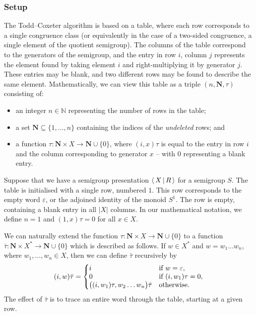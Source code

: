 \subsubsection{Setup}

The Todd--Coxeter algorithm is based on a table, where each row corresponds to a
single congruence class (or equivalently in the case of a two-sided congruence,
a single element of the quotient
semigroup).  The columns of the table correspond to the generators of the
semigroup, and the entry in row $i$, column $j$ represents the element found by
taking element $i$ and right-multiplying it by generator $j$.  These entries may
be blank, and two different rows may be found to describe the same element.
Mathematically, we can view this table as a triple $(n, \mathbf{N}, \tau)$
consisting of:
\begin{itemize}
\item an integer $n \in \mathbb{N}$ representing the number of rows in the table;
\item a set $\mathbf{N} \subseteq \{1, \ldots, n\}$ containing the indices of the
  \textit{undeleted} rows; and
\item a function $\tau: \mathbf{N} \times X \to \mathbf{N} \cup \{0\}$, where
  $(i, x)\tau$ is equal to the entry in row $i$ and the column corresponding to
  generator $x$ -- with $0$ representing a blank entry.
\end{itemize}

Suppose that we have a semigroup presentation $\left\langle \, X \, \middle| \, R \, \right\rangle$ for a semigroup
$S$.  The table is initialised with a single row, numbered $1$.  This row
corresponds to the empty word $\varepsilon$, or the adjoined identity of the
monoid $S^1$.  The row is empty, containing a blank entry in all $|X|$ columns.
In our mathematical notation, we define $n=1$ and
$(1,x)\tau = 0$ for all $x \in X$.

We can naturally extend the function
$\tau: \mathbf{N} \times X \to \mathbf{N} \cup \{0\}$
to a function
$\bar{\tau}: \mathbf{N} \times X^* \to \mathbf{N} \cup \{0\}$
which is described as follows.
If $w \in X^*$ and $w=w_1 \ldots w_n$, where $w_1, \ldots, w_n \in X$,
then we can define $\bar\tau$ recursively by
$$
(i, w)\bar\tau = \left\{
\begin{matrix*}[l]
  i & \textnormal{if~} w=\varepsilon,\\
  0 & \textnormal{if~} (i, w_1)\tau=0,\\
  \big((i, w_1)\tau, w_2 \ldots w_n\big)\bar\tau & \textnormal{otherwise}.
\end{matrix*} \right.
$$
The effect of $\bar\tau$ is to trace an entire word through the table, starting
at a given row.

